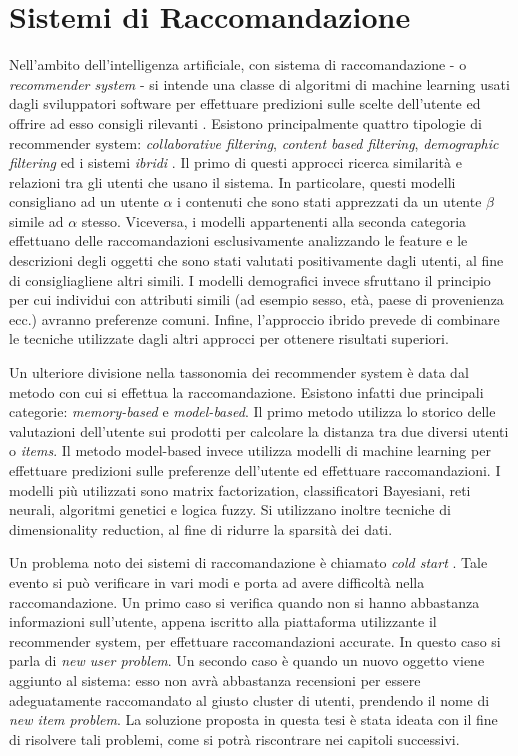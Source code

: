 \documentclass[11pt]{report}
\begin{document}
\section{Sistemi di Raccomandazione}


Nell'ambito dell'intelligenza artificiale, con sistema di raccomandazione - o \textit{recommender system} - si intende una classe di algoritmi di machine learning usati dagli sviluppatori software per effettuare predizioni sulle scelte dell'utente ed offrire ad esso consigli rilevanti \cite{indatalabs}.  
Esistono principalmente quattro tipologie di recommender system: \textit{collaborative filtering}, \textit{content based filtering}, \textit{demographic filtering} ed i sistemi \textit{ibridi} \cite{re-sys-survey}. Il primo di questi approcci ricerca similarità e relazioni tra gli utenti che usano il sistema. In particolare, questi modelli consigliano ad un utente \emph{$\alpha$} i contenuti che sono stati apprezzati da un utente \emph{$\beta$} simile ad \emph{$\alpha$} stesso. Viceversa, i modelli appartenenti alla seconda categoria effettuano delle raccomandazioni esclusivamente analizzando le feature e le descrizioni degli oggetti che sono stati valutati positivamente dagli utenti, al fine di consigliagliene altri simili. I modelli demografici invece sfruttano il principio per cui individui con attributi simili (ad esempio sesso, età, paese di provenienza ecc.) avranno preferenze comuni. Infine, l'approccio ibrido prevede di combinare le tecniche utilizzate dagli altri approcci per ottenere risultati superiori.

Un ulteriore divisione nella tassonomia dei recommender system è data dal metodo con cui si effettua la raccomandazione. Esistono infatti due principali categorie: \textit{memory-based} e\textit{ model-based}\cite{re-sys-survey}. Il primo metodo utilizza lo storico delle valutazioni dell'utente sui prodotti per calcolare la distanza tra due diversi utenti o \textit{items}. Il metodo model-based invece utilizza modelli di machine learning per effettuare predizioni sulle preferenze dell'utente ed effettuare raccomandazioni. I modelli più utilizzati sono matrix factorization, classificatori Bayesiani, reti neurali, algoritmi genetici e logica fuzzy. Si utilizzano inoltre tecniche di dimensionality reduction, al fine di ridurre la sparsità dei dati.


Un problema noto dei sistemi di raccomandazione è chiamato \textit{cold start} \cite{re-sys-survey}. Tale evento si può verificare in vari modi e porta ad avere difficoltà nella raccomandazione. Un primo caso si verifica quando non si hanno abbastanza informazioni sull'utente, appena iscritto alla piattaforma utilizzante il recommender system, per effettuare raccomandazioni accurate. In questo caso si parla di \textit{new user problem}. Un secondo caso è quando un nuovo oggetto viene aggiunto al sistema: esso non avrà abbastanza recensioni per essere adeguatamente raccomandato al giusto cluster di utenti, prendendo il nome di \textit{new item problem}. La soluzione proposta in questa tesi è stata ideata con il fine di risolvere tali problemi, come si potrà riscontrare nei capitoli successivi.\\
\end{document}
